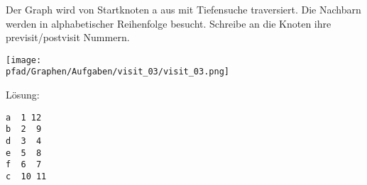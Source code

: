 \question[3]
Der Graph wird von Startknoten a aus mit Tiefensuche traversiert. Die
  Nachbarn werden in alphabetischer Reihenfolge besucht.
  Schreibe an die Knoten ihre previsit/postvisit Nummern.

\texttt{[image: \\pfad/Graphen/Aufgaben/visit\_03/visit\_03.png]}

\ifprintanswers
Lösung:
\begin{lstlisting}
a  1 12
b  2  9
d  3  4
e  5  8
f  6  7
c  10 11
\end{lstlisting}
\fi
